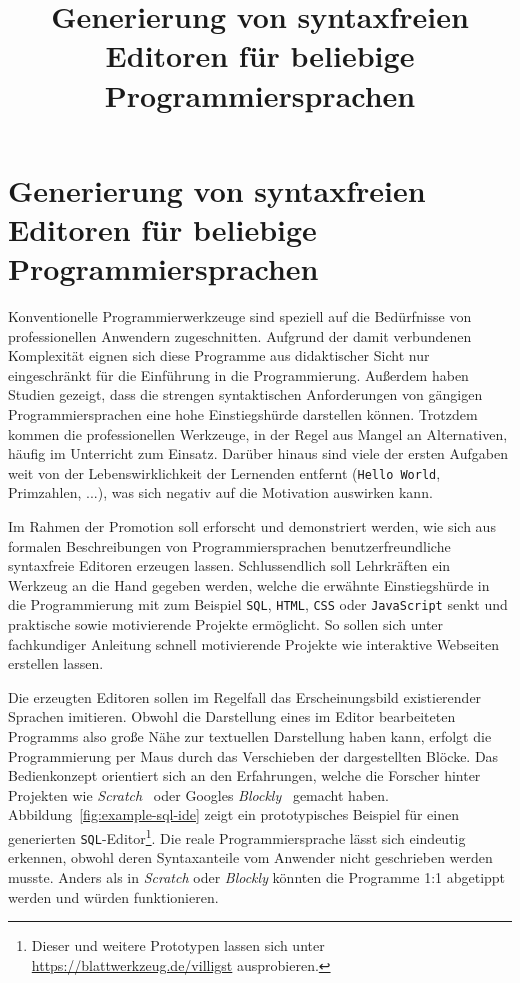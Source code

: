 \documentclass[paper=a4,fontsize=11pt,parskip=half]{scrartcl}
\title{Generierung von syntaxfreien Editoren für beliebige Programmiersprachen}
\begin{document}
\pagestyle{empty}

\tableofcontents

\clearpage
{}
\section{Generierung von syntaxfreien Editoren für beliebige Programmiersprachen}

Konventionelle Programmierwerkzeuge sind speziell auf die Bedürfnisse von professionellen Anwendern zugeschnitten. Aufgrund der damit verbundenen Komplexität eignen sich diese Programme aus didaktischer Sicht nur eingeschränkt für die Einführung in die Programmierung. Außerdem haben Studien gezeigt, dass die strengen syntaktischen Anforderungen von gängigen Programmiersprachen eine hohe Einstiegshürde darstellen können\cite{resnick_scratch:_2009}. Trotzdem kommen die professionellen Werkzeuge, in der Regel aus Mangel an Alternativen, häufig im Unterricht zum Einsatz. Darüber hinaus sind viele der ersten Aufgaben weit von der Lebenswirklichkeit der Lernenden entfernt (\texttt{Hello World}, Primzahlen, ...), was sich negativ auf die Motivation auswirken kann\cite{resnick_scratch:_2009}.

Im Rahmen der Promotion soll erforscht und demonstriert werden, wie sich aus formalen Beschreibungen von Programmiersprachen benutzerfreundliche syntaxfreie Editoren erzeugen lassen. Schlussendlich soll Lehrkräften ein Werkzeug an die Hand gegeben werden, welche die erwähnte Einstiegshürde in die Programmierung mit zum Beispiel \texttt{SQL}, \texttt{HTML}, \texttt{CSS} oder \texttt{JavaScript} senkt und praktische sowie motivierende Projekte ermöglicht. So sollen sich unter fachkundiger Anleitung schnell motivierende Projekte wie interaktive Webseiten erstellen lassen.

Die erzeugten Editoren sollen im Regelfall das Erscheinungsbild existierender Sprachen imitieren. Obwohl die Darstellung eines im Editor bearbeiteten Programms also große Nähe zur textuellen Darstellung haben kann, erfolgt die Programmierung per Maus durch das Verschieben der dargestellten Blöcke. Das Bedienkonzept orientiert sich an den Erfahrungen, welche die Forscher hinter Projekten wie \textit{Scratch}~\cite{maloney_scratch:_2004} oder Googles \textit{Blockly}~\cite{fraser_ten_2015} gemacht haben. Abbildung~\ref{fig:example-sql-ide} zeigt ein prototypisches Beispiel für einen generierten \texttt{SQL}-Editor\footnote{Dieser und weitere Prototypen lassen sich unter \url{https://blattwerkzeug.de/villigst} ausprobieren.}. Die reale Programmiersprache lässt sich eindeutig erkennen, obwohl deren Syntaxanteile vom Anwender nicht geschrieben werden musste. Anders als in \textit{Scratch} oder \textit{Blockly} könnten die Programme 1:1 abgetippt werden und würden funktionieren.
\end{document}
